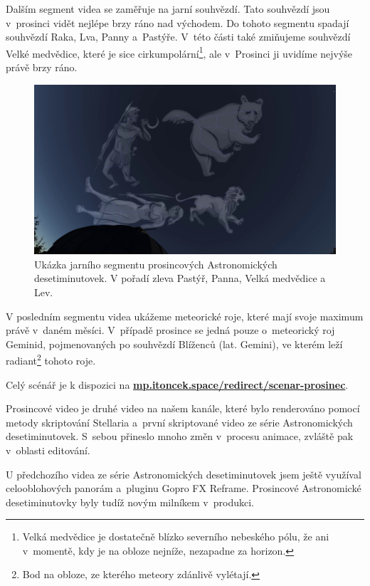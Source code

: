 \documentclass[12pt,a4paper,titlepage]{article}
\newcommand{\link}[2]{\href{#1}{\textcolor{link-color}{\textbf{#2}}}}%
\begin{document}
Dalším segment videa se zaměřuje na jarní souhvězdí. Tato souhvězdí jsou v~prosinci vidět nejlépe brzy ráno nad východem. Do tohoto segmentu spadají souhvězdí Raka, Lva, Panny a~Pastýře. V~této části také zmiňujeme souhvězdí Velké medvědice, které je sice cirkumpolární\footnote{Velká medvědice je dostatečně blízko severního nebeského pólu, že ani v~momentě, kdy je na obloze nejníže, nezapadne za horizon.}, ale v~Prosinci ji uvidíme nejvýše právě brzy ráno.

\begin{figure}[H]
	\centering
	\includegraphics[width=.95\textwidth]{ac12_jaro.png}
	\caption{Ukázka jarního segmentu prosincových Astronomických desetiminutovek. V pořadí zleva Pastýř, Panna, Velká medvědice a Lev.}\label{prac:ac12_jaro}
\end{figure}

V posledním segmentu videa ukážeme meteorické roje, které mají svoje maximum právě v~daném měsíci. V~případě prosince se jedná pouze o~meteorický roj Geminid, pojmenovaných po souhvězdí Blíženců (lat. Gemini), ve kterém leží radiant\footnote{Bod na obloze, ze kterého meteory zdánlivě vylétají.} tohoto roje.

Celý scénář je k dispozici na \link{https://mp.itoncek.space/redirect/scenar-prosinec}{mp.itoncek.space/redirect/scenar-prosinec}.

Prosincové video je druhé video na našem kanále, které bylo renderováno pomocí metody skriptování Stellaria a~první skriptované video ze série Astronomických desetiminutovek. S~sebou přineslo mnoho změn v~procesu animace, zvláště pak v~oblasti editování. 

U předchozího videa ze série Astronomických desetiminutovek jsem ještě využíval celooblohových panorám a~pluginu Gopro FX Reframe. Prosincové Astronomické desetiminutovky byly tudíž novým milníkem v~produkci.
\end{document}
